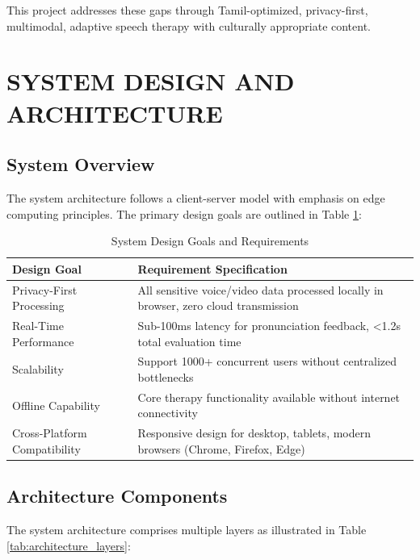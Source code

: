 \documentclass[12pt,a4paper]{article}
\begin{document}
This project addresses these gaps through Tamil-optimized, privacy-first, multimodal, adaptive speech therapy with culturally appropriate content.

\section{SYSTEM DESIGN AND ARCHITECTURE}

\subsection{System Overview}

The system architecture follows a client-server model with emphasis on edge computing principles. The primary design goals are outlined in Table \ref{tab:design_goals}:

\begin{table}[H]
\centering
\caption{System Design Goals and Requirements}
\label{tab:design_goals}
\begin{tabular}{p{5cm}p{8.5cm}}
\toprule
\textbf{Design Goal} & \textbf{Requirement Specification} \\
\midrule
Privacy-First Processing & All sensitive voice/video data processed locally in browser, zero cloud transmission \\
\hline
Real-Time Performance & Sub-100ms latency for pronunciation feedback, <1.2s total evaluation time \\
\hline
Scalability & Support 1000+ concurrent users without centralized bottlenecks \\
\hline
Offline Capability & Core therapy functionality available without internet connectivity \\
\hline
Cross-Platform Compatibility & Responsive design for desktop, tablets, modern browsers (Chrome, Firefox, Edge) \\
\bottomrule
\end{tabular}
\end{table}

\subsection{Architecture Components}

The system architecture comprises multiple layers as illustrated in Table \ref{tab:architecture_layers}:
\end{document}
